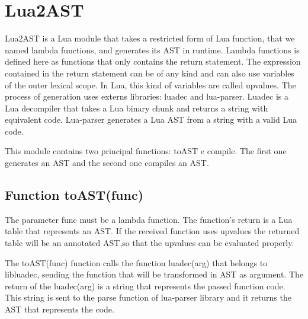 \documentclass[english]{llncs}
\begin{document}
\section{Lua2AST}
\label{sec:lua2ast}

Lua2AST is a Lua module that takes a restricted form of Lua function, that we named lambda functions, and generates its AST in runtime.
Lambda functions is defined here as functions that only contains the return statement.
The expression contained in the return statement can be of any kind and can also use variables of the outer lexical scope.
In Lua, this kind of variables are called upvalues.
The process of generation uses externs libraries: luadec and lua-parser.
Luadec \cite{LuaDec} is a Lua decompiler that takes a Lua binary chunk and returns a string with equivalent code.
Lua-parser \cite{lua-parser} generates a Lua AST from a string with a valid Lua code.

This module contains two principal functions: toAST e compile.
The first one generates an AST and the second one compiles an AST.

\subsection{Function toAST(func) }

The parameter func must be a lambda function.
The function's return is a Lua table that represents an AST.
If the received function uses upvalues the returned table will be an annotated AST,so that the upvalues can be evaluated properly.

The toAST(func) function calls the function luadec(arg) that belongs to libluadec, sending the function that will be transformed in AST as argument.
The return of the luadec(arg) is a string that represents the passed function code.
This string is sent to the parse function of lua-parser library and it returns the AST that represents the code.
\end{document}
